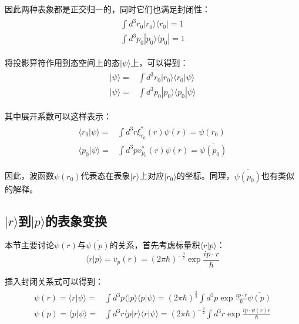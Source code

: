     因此两种表象都是正交归一的，同时它们也满足封闭性：
    \begin{align}
        \begin{split}
            \int d^3 r_0|r_0\rangle\langle r_0|=1\\
            \int d^3 p_0 |p_0\rangle\langle p_0|=1
        \end{split}
    \end{align}
    
    将投影算符作用到态空间上的态$|\psi\rangle$上，可以得到：
    \begin{align}
        \begin{split}
            |\psi\rangle=&\int d^3 r_0|r_0\rangle\langle r_0|\psi\rangle\\
            |\psi\rangle=&\int d^3 p_0|p_0\rangle\langle p_0|\psi\rangle
        \end{split}
    \end{align}
    
    其中展开系数可以这样表示：
    \begin{align}
        \begin{split}
            \langle r_0|\psi\rangle=&\int d^3 r\xi_{r_0}^*(r)\psi(r)=\psi(r_0)\\
            \langle p_0|\psi\rangle =& \int d^3p v_{p_0}^*(r)\psi(r)=\overline{\psi(p_0)}
        \end{split}
    \end{align}
    
    因此，波函数$\psi(r_0)$代表态在表象$|r\rangle$上对应$|r_0\rangle$的坐标。同理，$\overline{\psi(p_0)}$也有类似的解释。
    \subsection{$|r\rangle$到$|p\rangle$的表象变换}
        本节主要讨论$\psi(r)$与$\overline{\psi(p)}$的关系，首先考虑标量积$\langle r|p\rangle$：
        \begin{equation}
            \langle r|p\rangle=v_p(r)=(2\pi\hbar)^{-\frac{3}{2}}\exp{\frac{ip\cdot r}{\hbar}}
        \end{equation}
        
        插入封闭关系式可以得到：
        \begin{align}
            \begin{split}
                \psi(r)=\langle r|\psi\rangle=&\int d^3 p\langle|p\rangle\langle p|\psi\rangle =(2\pi\hbar)^{\frac{3}{2}}\int d^3 p\exp{\frac{ip\cdot r}{\hbar}}\overline{\psi(p)}\\
                \overline{\psi(p)}=\langle p|\psi\rangle=&\int d^3 r\langle p|r\rangle\langle r|\psi\rangle=(2\pi\hbar)^{-\frac{3}{2}}\int d^3r\exp{\frac{ip\cdot\psi(r) r}{\hbar}}
            \end{split}
        \end{align}
        
